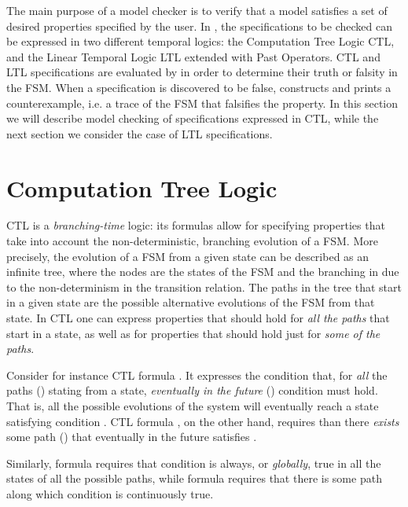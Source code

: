 The main purpose of a model checker is to verify that a model satisfies
a set of desired properties specified by the user.
In \nusmv, the specifications to be checked can be expressed in
two different temporal logics: the Computation Tree Logic CTL, and the
Linear Temporal Logic LTL extended with Past Operators.
CTL and LTL specifications are evaluated by \nusmv in order to
determine their truth or falsity in the FSM. When a specification is
discovered to be false, \nusmv constructs and prints a
counterexample, i.e. a trace of the FSM that falsifies the property.
In this section we will describe model checking of specifications
expressed in CTL, while the next section we consider the case of LTL
specifications.


\section{Computation Tree Logic}
\label{Computation Tree Logic}

CTL is a \emph{branching-time} logic: its formulas allow for
specifying properties that take into account the non-deterministic,
branching evolution of a FSM. More precisely, the evolution of a FSM
from a given state can be described as an infinite tree, where the nodes
are the states of the FSM and the branching in due to the
non-determinism in the transition relation. The paths in the tree that
start in a given state are the possible alternative evolutions of the
FSM from that state. In CTL one can express properties that should hold for \emph{all the
paths} that start in a state, as well as for properties that should hold
just for \emph{some of the paths}.

Consider for instance CTL formula . It expresses the
condition that, for \emph{all} the paths () stating from a
state, \emph{eventually in the future} () condition 
must hold. That is, all the possible evolutions of the system will
eventually reach a state satisfying condition .
CTL formula , on the other hand, requires than there
\emph{exists} some path () that eventually in the future
satisfies .

Similarly, formula  requires that condition  is
always, or \emph{globally}, true in all the states of all the possible
paths, while formula  requires that there is some path along
which condition  is continuously true.


